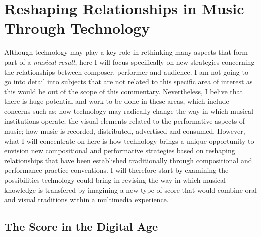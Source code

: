 \section{Reshaping Relationships in Music Through Technology}

Although technology may play a key role in rethinking many aspects that form part of a \emph{musical result}, here I will focus specifically on new strategies concerning the relationships between composer, performer and audience. I am not going to go into detail into subjects that are not related to this specific area of interest as this would be out of the scope of this commentary. Nevertheless, I belive that there is huge potential and work to be done in these areas, which include concerns such as: how technology may radically change the way in which musical institutions operate; the visual elements related to the performative aspects of music; how music is recorded, distributed, advertised and consumed. However, what I will concentrate on here is how technology brings a unique opportunity to envision new compositional and performative strategies based on reshaping relationships that have been established traditionally through compositional and performance-practice conventions. I will therefore start by examining the possibilities technology could bring in revising the way in which musical knowledge is transfered by imagining a new type of score that would combine oral and visual traditions within a multimedia experience.
\hypertarget{superscore}{}

\subsection{The Score in the Digital Age}


